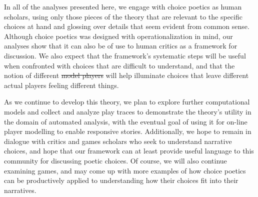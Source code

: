 \documentclass[arts,article,submit,moreauthors,pdftex,10pt,a4paper]{Definitions/mdpi}
\providecommand{\DIFadd}[1]{{\protect\color{blue}\uwave{#1}}} %
\providecommand{\DIFdel}[1]{{\protect\color{red}\sout{#1}}}                      %
\providecommand{\DIFaddbegin}{} %
\providecommand{\DIFaddend}{} %
\providecommand{\DIFdelbegin}{} %
\providecommand{\DIFdelend}{} %
\begin{document}
In all of the analyses presented here, we engage with choice poetics as human scholars, using only those pieces of the theory that are relevant to the specific choices at hand and glossing over details that seem evident from common sense.
%
Although choice poetics was designed with operationalization in mind, our analyses show that it can also be of use to human critics as a framework for discussion.
%
We also expect that the framework's systematic steps will be useful when confronted with choices that are difficult to understand, and that the notion of different \DIFdelbegin \DIFdel{model players }\DIFdelend \DIFaddbegin \DIFadd{player models }\DIFaddend will help illuminate choices that leave different actual players feeling different things.


As we continue to develop this theory, we plan to explore further computational models and collect and analyze play traces to demonstrate the theory's utility in the domain of automated analysis, with the eventual goal of using it for on-line player modelling to enable responsive stories.
%
Additionally, we hope to remain in dialogue with critics and games scholars who seek to understand narrative choices, and hope that our framework can at least provide useful language to this community for discussing poetic choices.
%
Of course, we will also continue examining games, and may come up with more examples of how choice poetics can be productively applied to understanding how their choices fit into their narratives.

\vspace{6pt} 

\DIFdelbegin %
\DIFdelend \DIFaddbegin {}
\DIFaddend 





\end{document}
